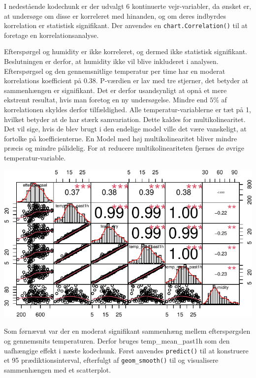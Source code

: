 \documentclass[
  12pt,
  a4paper,
  DIV=11,
  numbers=noendperiod]{scrartcl}
\begin{document}
I nedestående kodechunk er der udvalgt 6 kontinuerte vejr-variabler, da
ønsket er, at undersøge om disse er korreleret med hinanden, og om deres
indbyrdes korrelation er statistisk signifikant. Der anvendes en
\texttt{chart.Correlation()} til at foretage en korrelationsanalyse.

Efterspørgel og humidity er ikke korreleret, og dermed ikke statistisk
signifikant. Beslutningen er derfor, at humidity ikke vil blive
inkluderet i analysen. Efterspørgsel og den gennemsnitlige temperatur
per time har en moderat korrelations koefficient på 0.38. P-værdien er
lav med tre stjerner, det betyder at sammenhængen er signifikant. Det er
derfor usandsynligt at opnå et mere ekstremt resultat, hvis man foretog
en ny undersøgelse. Mindre end \(5\%\) af korrelationen skyldes derfor
tilfældighed. Alle temperatur-variablerne er tæt på 1, hvilket betyder
at de har stærk samvariation. Dette kaldes for multikolinearitet. Det
vil sige, hvis de blev brugt i den endelige model ville det være
vanskeligt, at fortolke på koefficienterne. En Model med høj
multikolinearitet bliver mindre præcis og mindre pålidelig. For at
reducere multikolineariteten fjernes de øvrige temperatur-variable.

\includegraphics{Semester_projekt_2022_G1_files/figure-pdf/Chunk 11 - Korrelationsmatrice-1.pdf}

Som førnævnt var der en moderat signifikant sammenhæng mellem
efterspørgslen og gennemsnits temperaturen. Derfor bruges
temp\_mean\_past1h som den uafhængige effekt i næste kodechunk. Først
anvendes \texttt{predict()} til at konstruere et 95\(%
\) prædiktionsinterval, efterfulgt af \texttt{geom\_smooth()} til og
visualisere sammenhængen med et scatterplot.
\end{document}
